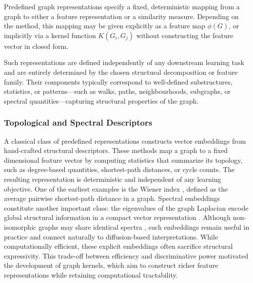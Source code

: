 Predefined graph representations specify a fixed, deterministic mapping from a
graph to either a feature representation or a similarity measure. Depending on
the method, this mapping may be given explicitly as a feature map $\phi(G)$, or
implicitly via a kernel function $K(G_i,G_j)$ without constructing the feature
vector in closed form.

Such representations are defined independently of any downstream learning task
and are entirely determined by the chosen structural decomposition or feature
family. Their components typically correspond to well-defined substructures,
statistics, or patterns---such as walks, paths, neighbourhoods, subgraphs, or
spectral quantities—capturing structural properties of the graph.

\subsubsection{Topological and Spectral Descriptors}

A classical class of predefined representations constructs
vector embeddings from hand-crafted structural descriptors.
These methods map a graph to a fixed dimensional feature vector
by computing statistics that summarize its topology,
such as degree-based quantities, shortest-path distances,
or cycle counts.
The resulting representation is deterministic and
independent of any learning objective. One of the earliest examples is the Wiener index
\citep{doi:10.1021/ja01193a005}, defined as the average
pairwise shortest-path distance in a graph.
Spectral embeddings constitute another important class:
the eigenvalues of the graph Laplacian encode global structural
information in a compact vector representation
\citep{brouwer2012spectra}.
Although non-isomorphic graphs may share identical spectra
\citep{WILSON20082833}, such embeddings remain useful in practice
and connect naturally to diffusion-based interpretations.
While computationally efficient, these explicit embeddings often
sacrifice structural expressivity.
This trade-off between efficiency and discriminative power
motivated the development of graph kernels, which aim to construct
richer feature representations while retaining computational
tractability.


